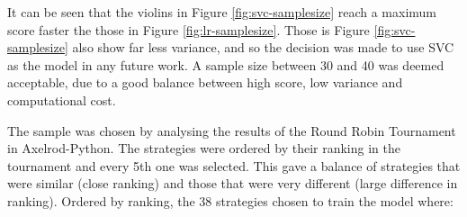 It can be seen that the violins in Figure \ref{fig:svc-samplesize} reach a maximum score faster the those in Figure \ref{fig:lr-samplesize}.
Those is Figure \ref{fig:svc-samplesize} also show far less variance, and so the decision was made to use SVC as the model in any future work.
A sample size between 30 and 40 was deemed acceptable, due to a good balance between high score, low variance and computational cost.

The sample was chosen by analysing the results of the Round Robin Tournament in Axelrod-Python.
The strategies were ordered by their ranking in the tournament and every 5th one was selected.
This gave a balance of strategies that were similar (close ranking) and those that were very different (large difference in ranking).
Ordered by ranking, the 38 strategies chosen to train the model where:


